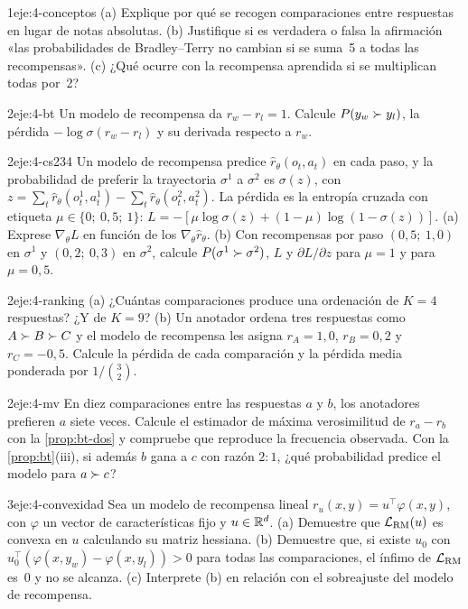 \begin{ejercicio}{1}{eje:4-conceptos}
(a) Explique por qué se recogen comparaciones entre respuestas en lugar de notas absolutas. (b) Justifique si es verdadera o falsa la afirmación «las probabilidades de Bradley--Terry no cambian si se suma~5 a todas las recompensas». (c) ¿Qué ocurre con la recompensa aprendida si se multiplican todas por~2?
\end{ejercicio}

\begin{ejercicio}{2}{eje:4-bt}
Un modelo de recompensa da $r_w-r_l=1$. Calcule $P(y_w\succ y_l)$, la pérdida $-\log\sigma(r_w-r_l)$ y su derivada respecto a $r_w$.
\end{ejercicio}

\begin{ejercicio}{2}{eje:4-cs234}
Un modelo de recompensa predice $\hat r_\theta(o_t,a_t)$ en cada paso, y la probabilidad de preferir la trayectoria $\sigma^{1}$ a $\sigma^{2}$ es $\sigma(z)$, con $z=\sum_t\hat r_\theta(o^{1}_t,a^{1}_t)-\sum_t\hat r_\theta(o^{2}_t,a^{2}_t)$. La pérdida es la entropía cruzada con etiqueta $\mu\in\{0;\ 0{,}5;\ 1\}$: $L=-[\mu\log\sigma(z)+(1-\mu)\log(1-\sigma(z))]$. (a) Exprese $\nabla_\theta L$ en función de los $\nabla_\theta\hat r_\theta$. (b) Con recompensas por paso $(0{,}5;\ 1{,}0)$ en $\sigma^{1}$ y $(0{,}2;\ 0{,}3)$ en $\sigma^{2}$, calcule $P(\sigma^{1}\succ\sigma^{2})$, $L$ y $\partial L/\partial z$ para $\mu=1$ y para $\mu=0{,}5$.
\end{ejercicio}

\begin{ejercicio}{2}{eje:4-ranking}
(a) ¿Cuántas comparaciones produce una ordenación de $K=4$ respuestas? ¿Y de $K=9$? (b) Un anotador ordena tres respuestas como $A\succ B\succ C$ y el modelo de recompensa les asigna $r_A=1{,}0$, $r_B=0{,}2$ y $r_C=-0{,}5$. Calcule la pérdida de cada comparación y la pérdida media ponderada por $1/\binom{3}{2}$.
\end{ejercicio}

\begin{ejercicio}{2}{eje:4-mv}
En diez comparaciones entre las respuestas $a$ y $b$, los anotadores prefieren $a$ siete veces. Calcule el estimador de máxima verosimilitud de $r_a-r_b$ con la \cref{prop:bt-dos} y compruebe que reproduce la frecuencia observada. Con la \cref{prop:bt}(iii), si además $b$ gana a $c$ con razón $2{:}1$, ¿qué probabilidad predice el modelo para $a\succ c$?
\end{ejercicio}

\begin{ejercicio}{3}{eje:4-convexidad}
Sea un modelo de recompensa lineal $r_u(x,y)=u^{\top}\varphi(x,y)$, con $\varphi$ un vector de características fijo y $u\in\mathbb{R}^{d}$. (a) Demuestre que $\mathcal{L}_{\mathrm{RM}}(u)$ es convexa en $u$ calculando su matriz hessiana. (b) Demuestre que, si existe $u_0$ con $u_0^{\top}(\varphi(x,y_w)-\varphi(x,y_l))>0$ para todas las comparaciones, el ínfimo de $\mathcal{L}_{\mathrm{RM}}$ es~0 y no se alcanza. (c) Interprete (b) en relación con el sobreajuste del modelo de recompensa.
\end{ejercicio}

